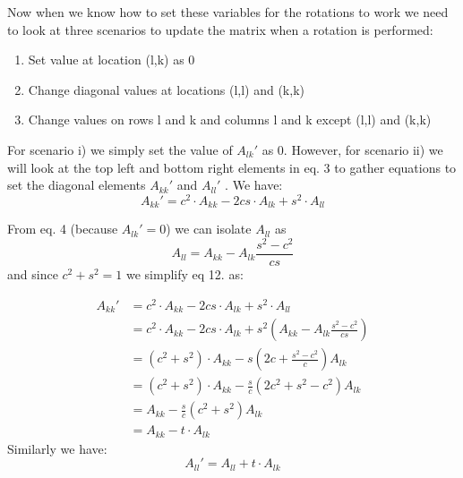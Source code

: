 \documentclass[12pt,twoside]{article}
\begin{document}
Now when we know how to set these variables for the rotations to work we need to look at three scenarios to update the matrix when a rotation is performed:

\begin{enumerate}[label=\roman*)]
  \item Set value at location (l,k) as 0
  \item Change diagonal values at locations (l,l) and (k,k)
  \item Change values on rows l and k and columns l and k except (l,l) and (k,k)
\end{enumerate}

For scenario i) we simply set the value of $A_{lk}'$ as 0. However, for scenario ii) we will look at the top left and bottom right elements in eq. 3 to gather equations to set the diagonal elements $A_{kk}'$ and $A_{ll}'$ . We have:
\begin{equation}
A_{kk}' = c^2 \cdot A_{kk} - 2cs\cdot A_{lk} + s^2\cdot A_{ll}
\end{equation}

From eq. 4 (because $A_{lk}'=0$) we can isolate $A_{ll}$ as\\
\begin{equation}
A_{ll} = A_{kk} - A_{lk}\frac{s^2-c^2}{cs}
\end{equation}
and since $c^2+s^2=1$ we simplify eq 12. as:

\begin{equation}
\begin{split}
A_{kk}' &= c^2 \cdot A_{kk} - 2cs\cdot A_{lk} + s^2\cdot A_{ll}\\
& = c^2 \cdot A_{kk} - 2cs\cdot A_{lk} + s^2 \left(A_{kk} - A_{lk}\frac{s^2-c^2}{cs}     \right)\\
& = (c^2 + s^2) \cdot A_{kk} - s\left(2c +  \frac{s^2-c^2}{c}      \right)A_{lk}\\
&= (c^2 + s^2) \cdot A_{kk} - \frac{s}{c}\left(2c^2 +  s^2-c^2      \right)A_{lk}\\
& = A_{kk} - \frac{s}{c}\left(c^2 +  s^2      \right)A_{lk}\\
& = A_{kk} - t\cdot A_{lk} 
\end{split}
\end{equation}
Similarly we have:\\
\begin{equation}
A_{ll}' = A_{ll} + t\cdot A_{lk}
\end{equation}
\end{document}
